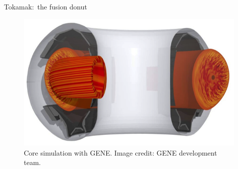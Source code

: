 \documentclass[12pt,table]{beamer}
\begin{document}
\begin{frame}{Tokamak:~the fusion donut}
\begin{minipage}{.35\linewidth}
\vspace{-1cm}
\begin{figure}
    \centering
    \includegraphics[width=1.2\linewidth]{figs/gene.png} \\
    \tiny Core simulation with GENE. Image credit: GENE development team.
\end{figure}
\end{minipage}
\end{frame}
\end{document}

